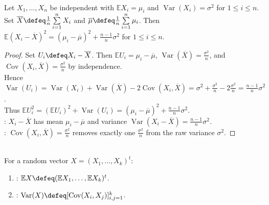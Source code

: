\begin{lemma} \label{lem:mean-centering-expected-square} \\
Let $X_1,\ldots,X_n$ be independent with $\mathbb{E}X_i=\mu_i$ and $\operatorname{Var}(X_i)=\sigma^2$ for $1\leq i\leq n$.\\
Set $\overline{X}\defeq \frac{1}{n}\sum\limits_{i=1}^{n}X_i$ and $\overline{\mu}\defeq \frac{1}{n}\sum\limits_{i=1}^{n}\mu_i$.
Then $\mathbb{E}(X_i-\overline{X})^2=(\mu_i-\overline{\mu})^2+\frac{n-1}{n}\sigma^2$ for $1\leq i\leq n$.
\begin{proof}
Set $U_i\defeq X_i-\overline{X}$. Then $\mathbb{E}U_i=\mu_i-\overline{\mu}$, $\operatorname{Var}(\overline{X})=\frac{\sigma^2}{n}$, and $\operatorname{Cov}(X_i,\overline{X})=\frac{\sigma^2}{n}$ by independence.\\
Hence $\operatorname{Var}(U_i)=\operatorname{Var}(X_i)+\operatorname{Var}(\overline{X})-2\operatorname{Cov}(X_i,\overline{X})=\sigma^2+\frac{\sigma^2}{n}-2\frac{\sigma^2}{n}=\frac{n-1}{n}\sigma^2$.\\
Thus $\mathbb{E}U_i^2=(\mathbb{E}U_i)^2+\operatorname{Var}(U_i)=(\mu_i-\overline{\mu})^2+\frac{n-1}{n}\sigma^2$.\\
: $X_i-\overline{X}$ has mean $\mu_i-\overline{\mu}$ and variance $\operatorname{Var}(X_i-\overline{X})=\frac{n-1}{n}\sigma^2$.\\
: $\operatorname{Cov}(X_i,\overline{X})=\frac{\sigma^2}{n}$ removes exactly one $\frac{\sigma^2}{n}$ from the raw variance $\sigma^2$.
\end{proof}
\end{lemma}

\begin{definition} \label{def:random-vector-mean-covariance-matrix} \\
For a random vector $X=(X_1,\ldots,X_k)^t$:
\begin{enumerate}[label=(\roman*)]
\setlength{\itemsep}{0pt}
\item {}: $\mathbb{E}X\defeq(\mathbb{E}X_1,\ldots,\mathbb{E}X_k)^t$.
\item {}: $\operatorname{Var}(X)\defeq[\operatorname{Cov}(X_i,X_j)]_{i,j=1}^{k}$.
\end{enumerate}
\end{definition}

